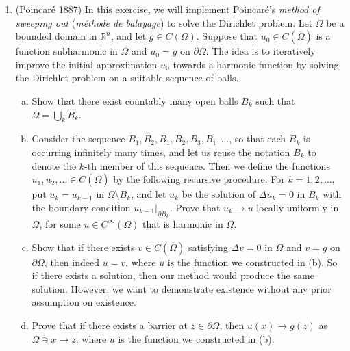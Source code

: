 \documentclass[11pt]{amsart}
\newcommand{\R}{\mathbb{R}}
\newcommand{\D}{\mathbb{D}}
\begin{document}
\begin{enumerate}[1.]
\begin{enumerate}[(a)]
Exhibit a two-variable real power series whose domain of convergence is the unit disk $\D=\{x\in\R^2:|x|<1\}$.
\item
Show that if $\Omega\subset\R^2$ is a domain of convergence of some power series centred at $0$,
then $\Omega$ is reflection symmetric with respect to the coordinate axes,
and $\{(\log x_1,\log x_2):x\in\Omega,\,x_1>0,\,x_2>0\}$ is a convex domain.
\end{enumerate}
\item (Poincar\'e 1887)
In this exercise, we will implement Poincar\'e's {\em method of sweeping out} ({\em m\'ethode de balayage}) to solve the Dirichlet problem.
Let $\Omega$ be a bounded domain in $\R^n$, and let $g\in C(\Omega)$.
Suppose that $u_0\in C(\overline\Omega)$ is a function subharmonic in $\Omega$ and $u_0=g$ on $\partial\Omega$.
The idea is to iteratively improve the initial approximation $u_0$ towards a harmonic function
by solving the Dirichlet problem on a suitable sequence of balls.
\begin{enumerate}[(a)]
\item
Show that there exist countably many open balls $B_k$ such that $\Omega=\bigcup_kB_k$.
\item
Consider the sequence $B_1,B_2,B_1,B_2,B_3,B_1,\ldots$, so that each $B_k$ is occurring infinitely many times,
and let us reuse the notation $B_k$ to denote the $k$-th member of this sequence.
Then we define the functions $u_1,u_2,\ldots \in C(\overline\Omega)$ by the following recursive procedure:
For $k=1,2,\ldots$, put $u_k=u_{k-1}$ in $\Omega\setminus B_k$, and let $u_k$ be the solution of $\Delta u_k=0$ in $B_k$ with the boundary condition $u_{k-1}|_{\partial B_k}$.
Prove that $u_k\to u$ locally uniformly in $\Omega$, for some $u\in C^\infty(\Omega)$ that is harmonic in $\Omega$.
\item
Show that if there exists $v\in C(\overline\Omega)$ satisfying $\Delta v = 0$ in $\Omega$ and $v=g$ on $\partial\Omega$,
then indeed $u=v$, where $u$ is the function we constructed in (b).
So if there exists a solution, then our method would produce the same solution.
However, we want to demonstrate existence without any prior assumption on existence.
\item
Prove that if there exists a barrier at $z\in\partial\Omega$, then $u(x)\to g(z)$ as $\Omega\ni x\to z$, where $u$ is the function we constructed in (b).

\end{enumerate}
\end{enumerate}
\end{document}
